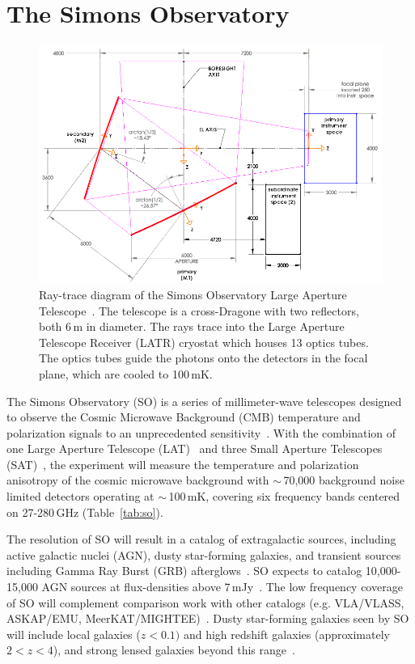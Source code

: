 \section{The Simons Observatory}
\begin{figure}[t]
    \centering
    \includegraphics[width = .95\textwidth]{Figures/LAT_rt.pdf}
    \caption{Ray-trace diagram of the Simons Observatory Large Aperture Telescope~\cite{Parshley_2018}.  The telescope is a cross-Dragone with two reflectors, both 6\,m in diameter.  The rays trace into the Large Aperture Telescope Receiver (LATR) cryostat which houses 13 optics tubes.  The optics tubes guide the photons onto the detectors in the focal plane, which are cooled to 100\,mK.}
    \label{fig:so_inst}
\end{figure}
The Simons Observatory (SO) is a series of millimeter-wave telescopes designed to observe the Cosmic Microwave Background (CMB) temperature and polarization signals to an unprecedented sensitivity~\cite{gali18, so19}. With the combination of one Large Aperture Telescope (LAT)~\cite{xu/etal:2020c, zhu18, orlo18, coppi/etal:2018} and three Small Aperture Telescopes (SAT)~\cite{ali20}, the experiment will measure the temperature and polarization anisotropy of the cosmic microwave background with $\sim$\,70,000 background noise limited detectors operating at $\sim$\,100\,mK, covering six frequency bands centered on 27-280\,GHz (Table~\ref{tab:so}).

The resolution of SO will result in a catalog of extragalactic sources, including active galactic nuclei (AGN), dusty star-forming galaxies, and transient sources including Gamma Ray Burst (GRB) afterglows~\cite{so_science}.  SO expects to catalog 10,000-15,000 AGN sources at flux-densities above 7\,mJy~\cite{Tucci_2011}.  The low frequency coverage of SO will complement comparison work with other catalogs (e.g. VLA/VLASS, ASKAP/EMU, MeerKAT/MIGHTEE)~\cite{so_science}.  Dusty star-forming galaxies seen by SO will include local galaxies ($z<0.1)$ and high redshift galaxies (approximately $2<z<4$), and strong lensed galaxies beyond this range~\cite{Marrone_2017}.

